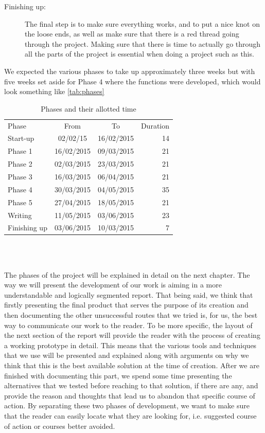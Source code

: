 \begin{description}
  \item[Finishing up:]The final step is to make sure everything works, and to put a nice knot on the loose ends, as well as make sure that there is a red thread going through the project. Making sure that there is time to actually go through all the parts of the project is essential when doing a project such as this. 
\end{description}

We expected the various phases to take up approximately three weeks but with five weeks set aside for Phase 4 where the functions were developed, which would look something like \autoref{tab:phases}\\

\begin{table}[h!]
\centering
\begin{tabular}{l | c | c | r}
Phase & From & To & Duration \\

Start-up & 02/02/15 & 16/02/2015 & 14 \\
Phase 1 & 16/02/2015 & 09/03/2015 & 21 \\
Phase 2 & 02/03/2015 & 23/03/2015 & 21 \\
Phase 3 & 16/03/2015 & 06/04/2015 & 21 \\
Phase 4 & 30/03/2015 & 04/05/2015 & 35 \\
Phase 5 & 27/04/2015 & 18/05/2015 & 21 \\
Writing & 11/05/2015 & 03/06/2015 & 23 \\
Finishing up & 03/06/2015 & 10/03/2015 & 7
\end{tabular} \\
\caption{Phases and their allotted time}
\label{tab:phases}
\end{table}\\


The phases of the project will be explained in detail on the next chapter. The way we will present the development of our work is aiming in a more understandable and logically segmented report. That being said, we think that firstly presenting the final product that serves the purpose of its creation and then documenting the other unsuccessful routes that we tried is, for us, the best way to communicate our work to the reader. To be more specific, the layout of the next section of the report will provide the reader with the process of creating a working prototype in detail. This means that the various tools and techniques that we use will be presented and explained along with arguments on why we think that this is the best available solution at the time of creation. After we are finished with documenting this part, we spend some time presenting the alternatives that we tested before reaching to that solution, if there are any, and provide the reason and thoughts that lead us to abandon that specific course of action. By separating these two phases of development, we want to make sure that the reader can easily locate what they are looking for, i.e. suggested course of action or courses better avoided. 

